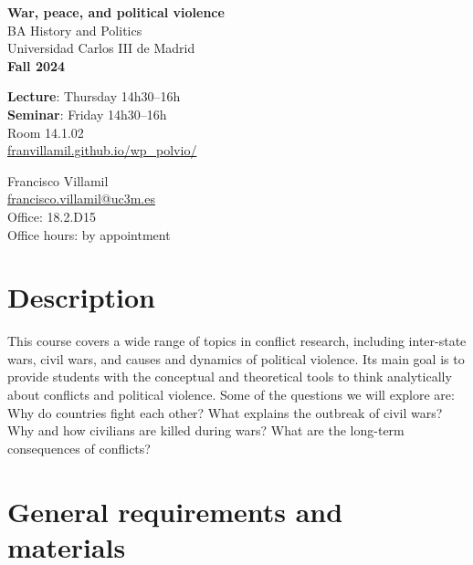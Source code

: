 \documentclass[12pt, a4paper]{article}
\begin{document}
\begin{center}
{\LARGE\bfseries War, peace, and political violence}\\\vspace{10pt}
BA History and Politics\\
Universidad Carlos III de Madrid\\\vspace{10pt}
{\large\bfseries Fall 2024}\\
\end{center}

\vspace{20pt}

\begin{minipage}{0.54\textwidth}
\flushleft
\textbf{Lecture}: Thursday 14h30--16h\\
\textbf{Seminar}: Friday 14h30--16h\\\vspace{5pt}
Room 14.1.02\\
\href{https://franvillamil.github.io/wp_polvio/}{franvillamil.github.io/wp\_polvio/}
\end{minipage}\hfill
\begin{minipage}{0.39\textwidth}
\flushleft
Francisco Villamil\\
\href{francisco.villamil@uc3m.es}{francisco.villamil@uc3m.es}\\
Office: 18.2.D15\\
Office hours: by appointment
\end{minipage}


\vspace{10pt}
\section{Description}

This course covers a wide range of topics in conflict research, including inter-state wars, civil wars, and causes and dynamics of political violence.
Its main goal is to provide students with the conceptual and theoretical tools to think analytically about conflicts and political violence. Some of the questions we will explore are: Why do countries fight each other?
What explains the outbreak of civil wars? Why and how civilians are killed during wars? What are the long-term consequences of conflicts?

\section{General requirements and materials}
\end{document}
